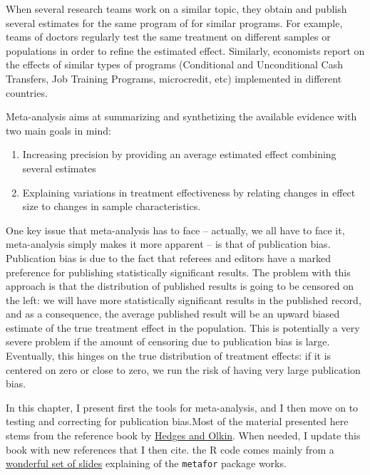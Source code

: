 \documentclass[]{book}
\providecommand{\tightlist}{%
  \setlength{\itemsep}{0pt}\setlength{\parskip}{0pt}}
\theoremstyle{definition}
\theoremstyle{definition}
\theoremstyle{definition}
\theoremstyle{remark}
\begin{document}
When several research teams work on a similar topic, they obtain and
publish several estimates for the same program of for similar programs.
For example, teams of doctors regularly test the same treatment on
different samples or populations in order to refine the estimated
effect. Similarly, economists report on the effects of similar types of
programs (Conditional and Unconditional Cash Transfers, Job Training
Programs, microcredit, etc) implemented in different countries.

Meta-analysis aims at summarizing and synthetizing the available
evidence with two main goals in mind:

\begin{enumerate}
\def\labelenumi{\arabic{enumi}.}
\tightlist
\item
  Increasing precision by providing an average estimated effect
  combining several estimates
\item
  Explaining variations in treatment effectiveness by relating changes
  in effect size to changes in sample characteristics.
\end{enumerate}

One key issue that meta-analysis has to face -- actually, we all have to
face it, meta-analysis simply makes it more apparent -- is that of
publication bias. Publication bias is due to the fact that referees and
editors have a marked preference for publishing statistically
significant results. The problem with this approach is that the
distribution of published results is going to be censored on the left:
we will have more statistically significant results in the published
record, and as a consequence, the average published result will be an
upward biased estimate of the true treatment effect in the population.
This is potentially a very severe problem if the amount of censoring due
to publication bias is large. Eventually, this hinges on the true
distribution of treatment effects: if it is centered on zero or close to
zero, we run the risk of having very large publication bias.

In this chapter, I present first the tools for meta-analysis, and I then
move on to testing and correcting for publication bias.Most of the
material presented here stems from the reference book by
\href{https://www.sciencedirect.com/book/9780080570655/statistical-methods-for-meta-analysis}{Hedges
and Olkin}. When needed, I update this book with new references that I
then cite. the R code comes mainly from a
\href{http://www.edii.uclm.es/~useR-2013/Tutorials/kovalchik/kovalchik_meta_tutorial.pdf}{wonderful
set of slides} explaining of the \texttt{metafor} package works.
\end{document}
